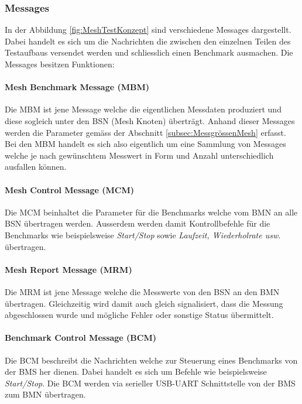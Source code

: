 \subsubsection{Messages}\label{subsubsec:Messages}
In der Abbildung \ref{fig:MeshTestKonzept} sind verschiedene Messages dargestellt. Dabei handelt es sich um die Nachrichten die zwischen den einzelnen Teilen des Testaufbaus versendet werden und schliesslich einen Benchmark ausmachen. Die Messages besitzen Funktionen:

\paragraph{Mesh Benchmark Message (MBM)}
Die MBM ist jene Message welche die eigentlichen Messdaten produziert und diese sogleich unter den BSN (Mesh Knoten) überträgt. Anhand dieser Messages werden die Parameter gemäss der Abschnitt \ref{subsec:MessgrössenMesh} erfasst. Bei den MBM handelt es sich also eigentlich um eine Sammlung von Messages welche je nach gewünschtem Messwert in Form und Anzahl unterschiedlich ausfallen können.

\paragraph{Mesh Control Message (MCM)}
Die MCM beinhaltet die Parameter für die Benchmarks welche vom BMN an alle BSN übertragen werden. Ausserdem werden damit Kontrollbefehle für die Benchmarks wie beispielsweise \textit{Start/Stop} sowie \textit{Laufzeit, Wiederholrate usw.} übertragen.

\paragraph{Mesh Report Message (MRM)}
Die MRM ist jene Message welche die Messwerte von den BSN an den BMN übertragen. Gleichzeitig wird damit auch gleich signalisiert, dass die Messung abgeschlossen wurde und mögliche Fehler oder sonstige Status übermittelt.

\paragraph{Benchmark Control Message (BCM)}
Die BCM beschreibt die Nachrichten welche zur Steuerung eines Benchmarks von der BMS her dienen. Dabei handelt es sich um Befehle wie beispielsweise \textit{Start/Stop}. Die BCM werden via serieller USB-UART Schnittstelle von der BMS zum BMN übertragen.

